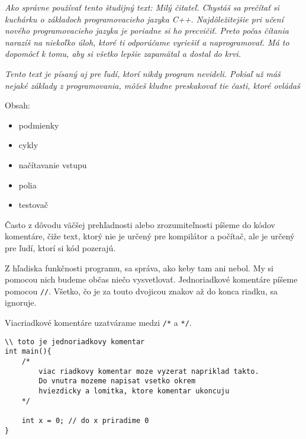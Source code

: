 




\textit{Ako správne používať tento študijný text: Milý čitateľ. Chystáš sa
prečítať si kuchárku o základoch programovacieho jazyka C++. Najdôležitejšie
pri učení nového programovacieho jazyka je poriadne si ho precvičiť. Preto
počas čítania narazíš na niekoľko úloh, ktoré ti odporúčame vyriešiť a
naprogramovať.  Má to dopomôcť k tomu, aby si všetko lepšie zapamätal a dostal
do krvi.}

\textit{Tento text je písaný aj pre ľudí, ktorí nikdy program nevideli. Pokiaľ
už máš nejaké základy z programovania, môžeš kludne preskakovať tie časti,
ktoré ovládaš}

Obsah:
\begin{itemize}
    \item podmienky
    \item cykly 
    \item načítavanie vstupu
    \item polia
    \item testovač
\end{itemize}

\medskip


Často z dôvodu väčšej prehľadnosti alebo zrozumiteľnosti píšeme do kódov komentáre,  
čiže text, ktorý nie je určený pre kompilátor a počítač, ale je určený pre ľudí,
ktorí si kód pozerajú. 

Z hľadiska funkčnosti programu, sa správa, ako keby tam ani nebol.
My si pomocou nich budeme občas niečo vysvetlovať. 
Jednoriadkové komentáre píšeme pomocou \verb!//!. Všetko, čo je za touto dvojicou
znakov až do konca riadku, sa ignoruje.

Viacriadkové komentáre uzatvárame medzi \verb!/*! a \verb!*/!.

\begin{lstlisting}
\\ toto je jednoriadkovy komentar
int main(){
    /*
        viac riadkovy komentar moze vyzerat napriklad takto.
        Do vnutra mozeme napisat vsetko okrem
        hviezdicky a lomitka, ktore komentar ukoncuju
    */
    
    int x = 0; // do x priradime 0
}
\end{lstlisting}

